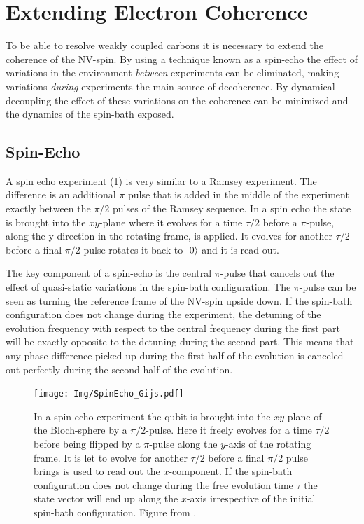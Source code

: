 \section{Extending Electron Coherence}

To be able to resolve weakly coupled carbons it is necessary to extend the coherence of the NV-spin.
By using a technique known as a spin-echo the effect of variations in the environment \emph{between} experiments can be eliminated, making variations \emph{during} experiments the main source of decoherence.
By dynamical decoupling the effect of these variations on the coherence can be minimized and the dynamics of the spin-bath exposed.


\subsection{Spin-Echo}

A spin echo experiment (\cref{fig:spin_echo_gijs}) is very similar to a Ramsey experiment.
The difference is an additional $\pi$ pulse that is added in the middle of the experiment exactly between the $\pi/2$ pulses of the Ramsey sequence.
In a spin echo the state is brought into the $xy$-plane where it evolves for a time $\tau/2$ before a $\pi$-pulse, along the y-direction in the rotating frame, is applied.
It evolves for another $\tau/2$ before a final $\pi/2$-pulse rotates it back to ${\left\vert{0}\right\rangle}$ and it is read out.

The key component of a spin-echo is the central $\pi$-pulse that cancels out the effect of quasi-static variations in the spin-bath configuration.
The $\pi$-pulse can be seen as turning the reference frame of the NV-spin upside down.
If the spin-bath configuration does not change during the experiment, the detuning of the evolution frequency with respect to the central frequency during the first part will be exactly opposite to the detuning during the second part.
This means that any phase difference picked up during the first half of the evolution is canceled out perfectly during the second half of the evolution.
\begin{figure}[htbp]
    \centering
    \texttt{[image: Img/SpinEcho\_Gijs.pdf]}
    \caption{In a spin echo experiment the qubit is brought into the $xy$-plane of the Bloch-sphere by a $\pi/2$-pulse. Here it freely evolves for a time $\tau/2$ before being flipped by a $\pi$-pulse along the $y$-axis of the rotating frame. It is let to evolve for another $\tau/2$ before a final $\pi/2$ pulse brings is used to read out the $x$-component.
    If the spin-bath configuration does not change during the free evolution time $\tau$ the state vector will end up along the $x$-axis irrespective of the initial spin-bath configuration.
    Figure from \citet{Lange2012Quantum}. }
    \label{fig:spin_echo_gijs}
\end{figure}


